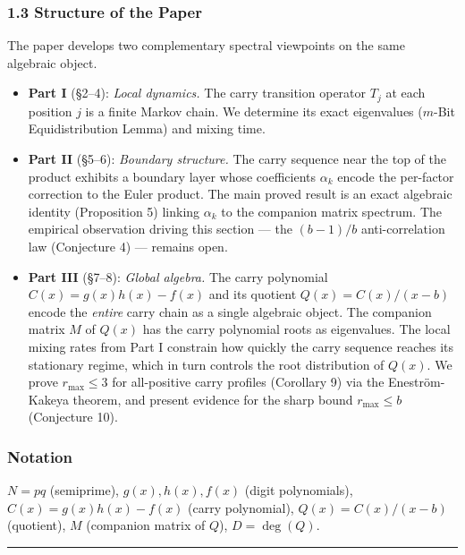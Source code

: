 \documentclass[
  11pt,
]{article}
\providecommand{\tightlist}{%
  \setlength{\itemsep}{0pt}\setlength{\parskip}{0pt}}
\begin{document}
\subsubsection{1.3 Structure of the Paper}\label{structure-of-the-paper}

The paper develops two complementary spectral viewpoints on the same algebraic
object.

\begin{itemize}
\tightlist
\item
  \textbf{Part I} (§2--4): \emph{Local dynamics.} The carry transition operator
  \(T_j\) at each position \(j\) is a finite Markov chain. We determine its
  exact eigenvalues (\(m\)-Bit Equidistribution Lemma) and mixing time.
\item
  \textbf{Part II} (§5--6): \emph{Boundary structure.} The carry sequence near
  the top of the product exhibits a boundary layer whose coefficients
  \(\alpha_k\) encode the per-factor correction to the Euler product. The main
  proved result is an exact algebraic identity (Proposition 5) linking
  \(\alpha_k\) to the companion matrix spectrum. The empirical observation
  driving this section --- the \((b-1)/b\) anti-correlation law (Conjecture 4)
  --- remains open.
\item
  \textbf{Part III} (§7--8): \emph{Global algebra.} The carry polynomial
  \(C(x) = g(x)h(x) - f(x)\) and its quotient \(Q(x) = C(x)/(x-b)\) encode the
  \emph{entire} carry chain as a single algebraic object. The companion matrix
  \(M\) of \(Q(x)\) has the carry polynomial roots as eigenvalues. The local
  mixing rates from Part I constrain how quickly the carry sequence reaches its
  stationary regime, which in turn controls the root distribution of \(Q(x)\).
  We prove \(r_{\max} \leq 3\) for all-positive carry profiles (Corollary 9) via
  the Eneström-Kakeya theorem, and present evidence for the sharp bound
  \(r_{\max} \leq b\) (Conjecture 10).
\end{itemize}

\subsubsection{Notation}\label{notation}

\(N = pq\) (semiprime), \(g(x), h(x), f(x)\) (digit polynomials),
\(C(x) = g(x)h(x) - f(x)\) (carry polynomial), \(Q(x) = C(x)/(x-b)\) (quotient),
\(M\) (companion matrix of \(Q\)), \(D = \deg(Q)\).

\begin{center}\rule{0.5\linewidth}{0.5pt}\end{center}
\end{document}
